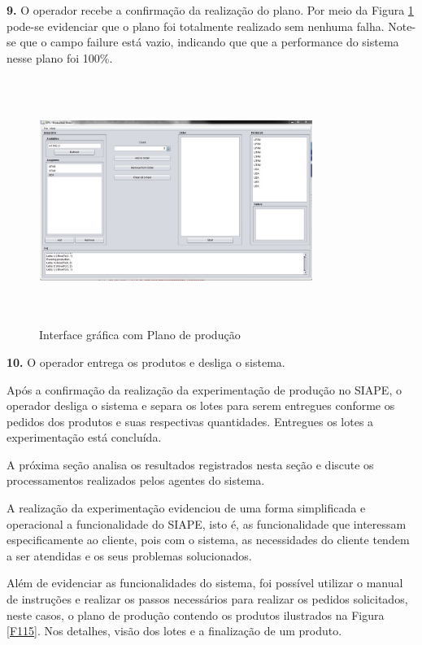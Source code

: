 \documentclass[10pt,letterpaper,twocolumn]{IEEEtran}
\begin{document}
	
	\textbf{9.} O operador recebe a confirmação da realização do plano. Por meio da Figura \ref{F114} 
	pode-se evidenciar que o plano foi totalmente realizado sem nenhuma falha. Note-se que o campo 
	failure está vazio, indicando que que a performance do sistema nesse plano foi 100\%.
	
	
	\begin{figure}[!h]
		\centering
		\includegraphics[width=8.9cm, height=8cm]{MeDSE_imagens/F114_SIAPE_PLANO_3_3.jpg} 
		\caption{Interface gráfica com Plano de produção}
		\label{F114}
	\end{figure}
	
	
	\textbf{10.} O operador entrega os produtos e desliga o sistema. 
	
	
	Após a confirmação da realização da experimentação de produção no SIAPE, o operador desliga o 
	sistema e separa os lotes para serem entregues conforme os pedidos dos produtos e suas respectivas 
	quantidades. Entregues os lotes a experimentação está concluída.
	
	A próxima seção analisa os resultados registrados nesta seção e discute os processamentos realizados 
	pelos agentes do sistema.
	
	\begin{center}
		
	\end{center}	
	
	A realização da experimentação evidenciou de uma forma simplificada e operacional a funcionalidade do 
	SIAPE, isto é, as funcionalidade que interessam especificamente ao cliente, pois com o sistema, as 
	necessidades do cliente tendem a ser atendidas e os seus problemas solucionados.\par 
	Além de evidenciar as funcionalidades do sistema, foi possível utilizar o manual de instruções e realizar
	os passos necessários para realizar os pedidos solicitados, neste casos, o plano de produção contendo os 
	produtos ilustrados na Figura  \ref{F115}. Nos detalhes, visão dos lotes e a  finalização de um 
	produto.\par
	
\end{document}
